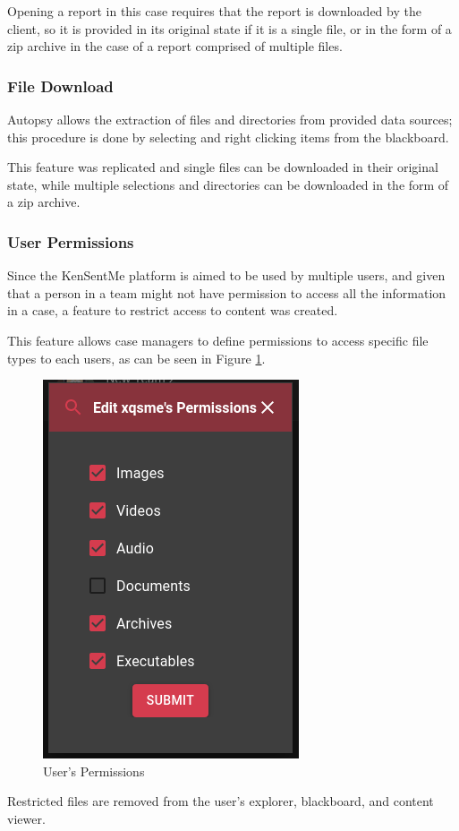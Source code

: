 Opening a report in this case requires that the report is downloaded by the client, so it is provided in its original state if it is a single file, or in the form of a zip archive in the case of a report comprised of multiple files.

\subsubsection*{File Download}

Autopsy allows the extraction of files and directories from provided data sources; this procedure is done by selecting and right clicking items from the blackboard.

This feature was replicated and single files can be downloaded in their original state, while multiple selections and directories can be downloaded in the form of a zip archive.

\subsubsection*{User Permissions}

Since the KenSentMe platform is aimed to be used by multiple users, and given that a person in a team might not have permission to access all the information in a case, a feature to restrict access to content was created.

This feature allows case managers to define permissions to access specific file types to each users, as can be seen in Figure \ref{fig:permissions}.

\begin{figure}[ht]
 \centering
 \includegraphics[width=0.35\linewidth]{imgs/permissions.png}
 \caption{User's Permissions}
 \label{fig:permissions}
\end{figure}

Restricted files are removed from the user's explorer, blackboard, and content viewer.

